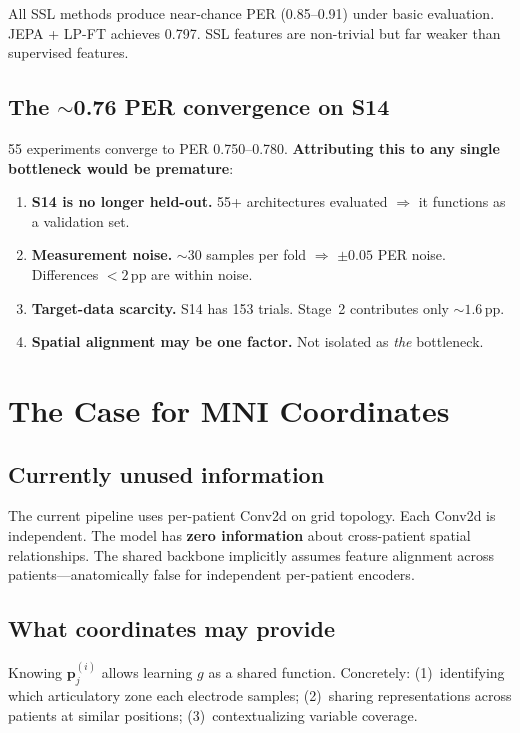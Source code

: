 \documentclass[11pt,letterpaper]{article}
\newcommand{\pp}{\,\text{pp}}
\newcommand{\bfp}{\mathbf{p}}
\begin{document}
All SSL methods produce near-chance PER (0.85--0.91) under basic evaluation. JEPA + LP-FT achieves 0.797. SSL features are non-trivial but far weaker than supervised features.

\subsection{The \texorpdfstring{${\sim}$0.76}{~0.76} PER convergence on S14}\label{sec:wall}

55 experiments converge to PER 0.750--0.780. \textbf{Attributing this to any single bottleneck would be premature}:
\begin{enumerate}[leftmargin=2em]
\item \textbf{S14 is no longer held-out.} 55+ architectures evaluated $\Rightarrow$ it functions as a validation set.
\item \textbf{Measurement noise.} ${\sim}30$ samples per fold $\Rightarrow$ ${\pm}0.05$ PER noise. Differences ${<}2\pp$ are within noise.
\item \textbf{Target-data scarcity.} S14 has 153 trials. Stage~2 contributes only ${\sim}1.6\pp$.
\item \textbf{Spatial alignment may be one factor.} Not isolated as \emph{the} bottleneck.
\end{enumerate}


\section{The Case for MNI Coordinates}

\subsection{Currently unused information}

The current pipeline uses per-patient Conv2d on grid topology. Each Conv2d is independent. The model has \textbf{zero information} about cross-patient spatial relationships. The shared backbone implicitly assumes feature alignment across patients---anatomically false for independent per-patient encoders.

\subsection{What coordinates may provide}

Knowing $\bfp_j^{(i)}$ allows learning $g$ as a shared function. Concretely: (1)~identifying which articulatory zone each electrode samples; (2)~sharing representations across patients at similar positions; (3)~contextualizing variable coverage.
\end{document}
